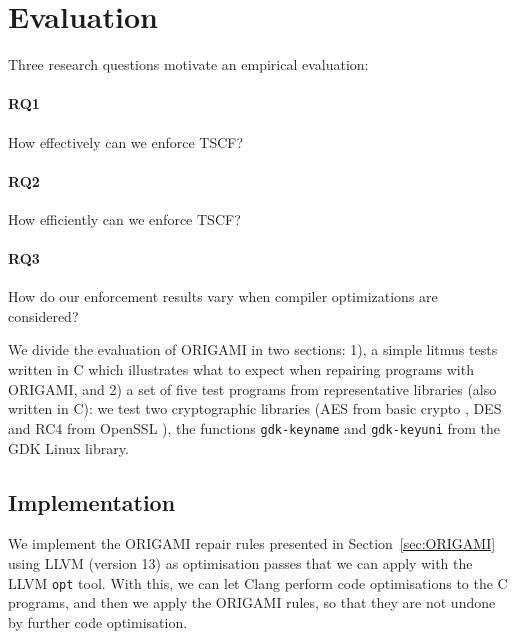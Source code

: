 {\section{Evaluation}
\label{sec:Evaluation}
Three research questions motivate an empirical evaluation:
\paragraph*{RQ1} How effectively can we enforce TSCF?
\paragraph*{RQ2} How efficiently can we enforce TSCF?
\paragraph*{RQ3} How do our enforcement results vary when compiler optimizations are considered?
%

We divide the evaluation of ORIGAMI in two sections: 1), a simple litmus tests written in C which illustrates what to expect when repairing programs with ORIGAMI, and 2) a set of five test programs from representative libraries (also written in C): we test two cryptographic libraries (AES from basic crypto \cite{AESBasic}, DES and RC4 from OpenSSL \cite{OpenSSL}), the functions \texttt{gdk-keyname} and \texttt{gdk-keyuni} from the GDK Linux library.%

\subsection{Implementation}
\label{sec:Tool} 
We implement the ORIGAMI repair rules presented in Section~\ref{sec:ORIGAMI} using LLVM (version 13) as optimisation passes that we can apply with the LLVM \texttt{opt} tool. With this, we can let Clang perform code optimisations to the C programs, and then we apply the ORIGAMI rules, so that they are not undone by further code optimisation. 

}
